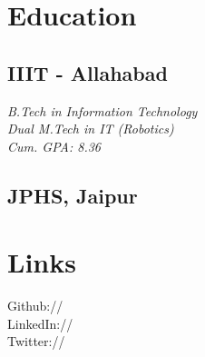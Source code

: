 \documentclass[]{deedy-resume-openfont}
\begin{document}
%
%
\lastupdated

%
%




%
%

\begin{minipage}[t]{0.33\textwidth}


\section{Education}

\subsection{IIIT - Allahabad}
\textit{B.Tech in Information Technology\\ Dual M.Tech in IT (Robotics) \\ Cum. GPA: 8.36}
\sectionsep

\subsection{JPHS, Jaipur}
\sectionsep


\section{Links}
Github:// \href{https://github.com/Ellusionists}{} \\
LinkedIn://  \href{https://www.linkedin.com/in/aditya-goel-11a578134/}{} \\
Twitter://  \href{https://twitter.com/itsAdityaGoel}{} \\
\sectionsep


\end{minipage}
\end{document}
